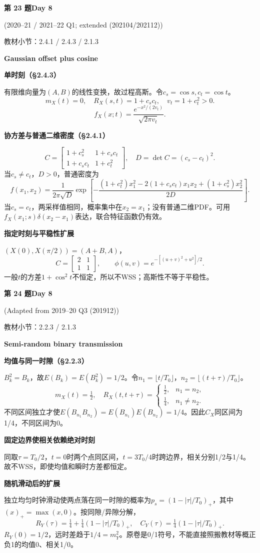 \documentclass[10.5pt,fontset=fandol]{ctexart}
\newcommand{\key}[1]{\par\vspace{4pt}\noindent\textbf{\color{navy}#1}\par\vspace{2pt}}
\newcommand{\qtitle}[2]{\par\addvspace{1.2em}\Needspace{8\baselineskip}\begin{tcolorbox}[colback=navy,colframe=navy,arc=1.5pt,boxrule=0pt]\color{white}\large\bfseries #1\hfill\small #2\end{tcolorbox}}
\begin{document}
\qtitle{第 23 题}{Day 8}
{\small\color{accentred}(2020--21 / 2021--22 Q1; extended (202104/202112))}\par\smallskip
{\small\color{muted}教材小节：2.4.1 / 2.4.3 / 2.1.3}\par\medskip
\noindent\textbf{Gaussian offset plus cosine}\par\smallskip\begin{tcolorbox}[breakable,colback=qbg,colframe=qbg,boxrule=0pt]\key{单时刻（§2.4.3）}
有限维向量为$(A,B)$的线性变换，故过程高斯。令$c_s=\cos s,c_t=\cos t$。
\[m_X(t)=0,\quad R_X(s,t)=1+c_sc_t,\quad v_t=1+c_t^2>0.\]
\[\boxed{f_X(x;t)=\frac{e^{-x^2/(2v_t)}}{\sqrt{2\pi v_t}}}.\]
\key{协方差与普通二维密度（§2.4.1）}
\[C=\begin{bmatrix}1+c_s^2&1+c_sc_t\\1+c_sc_t&1+c_t^2\end{bmatrix},\quad D=\det C=(c_s-c_t)^2.\]
当$c_s\ne c_t$，$D>0$，普通密度为
\[f(x_1,x_2)=\frac1{2\pi\sqrt D}\exp\!\left[-\frac{(1+c_t^2)x_1^2-2(1+c_sc_t)x_1x_2+(1+c_s^2)x_2^2}{2D}\right].\]
当$c_s=c_t$，两采样值相同，概率集中在$x_2=x_1$；没有普通二维PDF。可用$ f_X(x_1;s)\delta(x_2-x_1)$表达，联合特征函数仍有效。
\key{指定时刻与平稳性扩展}
$(X(0),X(\pi/2))=(A+B,A)$，
\[C=\begin{bmatrix}2&1\\1&1\end{bmatrix},\qquad\phi(u,v)=e^{-[(u+v)^2+u^2]/2}.\]
一般$t$的方差$1+\cos^2t$不恒定，所以不WSS；高斯性不等于平稳性。
\end{tcolorbox}
\qtitle{第 24 题}{Day 8}
{\small\color{accentred}(Adapted from 2019--20 Q3 (201912))}\par\smallskip
{\small\color{muted}教材小节：2.2.3 / 2.1.3}\par\medskip
\noindent\textbf{Semi-random binary transmission}\par\smallskip\begin{tcolorbox}[breakable,colback=qbg,colframe=qbg,boxrule=0pt]\key{均值与同一时隙（§2.2.3）}
$B_k^2=B_k$，故$E(B_k)=E(B_k^2)=1/2$。令$n_1=\lfloor t/T_0\rfloor$，$n_2=\lfloor(t+\tau)/T_0\rfloor$。
\[\boxed{m_X(t)=\tfrac12,\quad R_X(t,t+\tau)=\begin{cases}\tfrac12,&n_1=n_2,\\\tfrac14,&n_1\ne n_2.\end{cases}}\]
不同区间独立才使$E(B_{n_1}B_{n_2})=E(B_{n_1})E(B_{n_2})=1/4$。因此$C_X$同区间为1/4，不同区间为0。
\key{固定边界使相关依赖绝对时刻}
同取$\tau=T_0/2$，$t=0$时两个点同区间，$t=3T_0/4$时跨边界，相关分别1/2与1/4。故不WSS，即使均值和瞬时方差都恒定。
\key{随机滑动后的扩展}
独立均匀时钟滑动使两点落在同一时隙的概率为$p_s=(1-|\tau|/T_0)_+$，其中$(x)_+=\max(x,0)$。按同隙/异隙分解，
\[\boxed{R_Y(\tau)=\tfrac14+\tfrac14(1-|\tau|/T_0)_+},\quad C_Y(\tau)=\tfrac14(1-|\tau|/T_0)_+.\]
$R_Y(0)=1/2$，远时差趋于$1/4=m_Y^2$。原卷是0/1符号，不能直接照搬教材等概正负1的均值0、相关1/0。
\end{tcolorbox}
\end{document}
